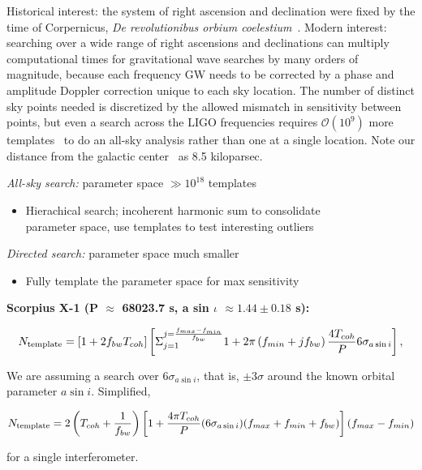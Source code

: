 Historical interest: the system of right ascension and declination were fixed by the time of Corpernicus, \textit{De revolutionibus orbium coelestium}~\cite{Hawking2002}.
Modern interest: searching over a wide range of right ascensions and declinations can multiply computational times for gravitational wave searches by many orders of magnitude, because each frequency GW needs to be corrected by a phase and amplitude Doppler correction unique to each sky location.
The number of distinct sky points needed is discretized by the allowed mismatch in sensitivity between points, but even a search across the LIGO frequencies requires $\mathcal{O}(10^9)$ more templates~\cite{GoetzTwoSpectMethods2011} to do an all-sky analysis rather than one at a single location. 
Note our distance from the galactic center~\cite{KerrLyndenBell1986} as 8.5 kiloparsec.




\emph{All-sky search: }parameter space $\gg10^{18}$ templates
\begin{itemize}
\item Hierachical search; incoherent harmonic sum to consolidate\\
parameter space, use templates to test interesting outliers
\end{itemize}

\emph{Directed search: }parameter space much smaller
\begin{itemize}
\item Fully template the parameter space for max sensitivity
\end{itemize}

\textbf{Scorpius X-1 (P $\approx$$ $ 68023.7 s, a sin $\iota$ $\approx1.44\pm0.18$
s):}


\[
N_{\textup{{template}}}=\left[1+2f_{bw}T_{coh}\right] \left[ {\displaystyle \Sigma}_{j=1}^{j = \frac{f_{max} - f_{min}}{f_{bw}}} 1 + 2\pi\left(f_{min} + j f_{bw}\right) \frac{4 T_{coh}}{P} 6 \sigma_{a \sin i} \right],
\]

\noindent We are assuming a search over $6\sigma_{a \sin i}$, that is, $\pm 3 \sigma$ around the known orbital parameter $a\sin i$. Simplified,

\begin{equation}
N_{\textup{template}} = 2 \left(T_{coh} + \frac{1}{f_{bw}}\right)\left[ 1+\frac{4 \pi T_{coh}}{P} (6\sigma_{a \sin i})(f_{max} + f_{min} + f_{bw})\right] (f_{max} - f_{min})
\end{equation}

\noindent for a single interferometer. 

